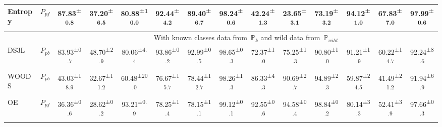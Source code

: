 \begin{table*}[!t]
{\begin{tabular}{lccccccccccccc}
    Entropy~\cite{Entropy}                                      & $P_{pf}$               & 87.83\textsuperscript{±0.8}          & 37.20\textsuperscript{±6.5}          & 80.88\textsuperscript{±10.0}         & 92.44\textsuperscript{±4.2}          & 89.40\textsuperscript{±6.7}          & 98.24\textsuperscript{±0.6}          & 42.24\textsuperscript{±1.3}          & 23.65\textsuperscript{±3.1}          & 73.19\textsuperscript{±3.2}          & 94.12\textsuperscript{±1.0}          & 67.83\textsuperscript{±7.0}          & 97.99\textsuperscript{±0.6}           \\ 
    \hline
                                                 &                      & \multicolumn{12}{c}{{\cellcolor[rgb]{0.753,0.753,0.753}}With known classes data from~$\mathbb{P}_{k}$ and wild data from~$\mathbb{P}_{wild}$}                                                                                                                                                                                                                                                                                                                                                                            \\
    DS3L~\cite{DS3L}                                         & $P_{pb}$               & 83.93\textsuperscript{±0.7}          & 48.70\textsuperscript{±2.9}          & 80.06\textsuperscript{±4.4}          & 93.86\textsuperscript{±0.2}          & 92.99\textsuperscript{±0.5}          & 98.65\textsuperscript{±0.3}          & 72.37\textsuperscript{±1.0}          & 75.25\textsuperscript{±1.3}          & 90.80\textsuperscript{±1.0}          & 91.21\textsuperscript{±1.9}          & 60.22\textsuperscript{±14.7}         & 92.24\textsuperscript{±8.6}           \\
    WOODS~\cite{WOODS}                                        & $P_{pb}$               & 43.03\textsuperscript{±18.9}         & 32.67\textsuperscript{±11.2}         & 60.48\textsuperscript{±20.0}         & 76.67\textsuperscript{±15.7}         & 78.44\textsuperscript{±12.7}         & 98.26\textsuperscript{±1.3}          & 86.33\textsuperscript{±4.3}          & 90.69\textsuperscript{±2.7}          & 94.89\textsuperscript{±2.3}          & 59.87\textsuperscript{±24.5}         & 41.49\textsuperscript{±21.2}         & 91.94\textsuperscript{±6.9}           \\
    OE~\cite{OE}                                           & $P_{pf}$               & 36.36\textsuperscript{±0.6}          & 28.62\textsuperscript{±0.2}          & 93.21\textsuperscript{±0.9}          & 78.25\textsuperscript{±1.4}          & 78.15\textsuperscript{±1.1}          & 99.12\textsuperscript{±0.1}          & 92.55\textsuperscript{±0.6}          & 94.58\textsuperscript{±0.4}          & 98.84\textsuperscript{±0.2}          & 80.14\textsuperscript{±3.3}          & 52.41\textsuperscript{±3.9}          & 97.66\textsuperscript{±0.3}           \\

\end{tabular}}
\end{table*}
